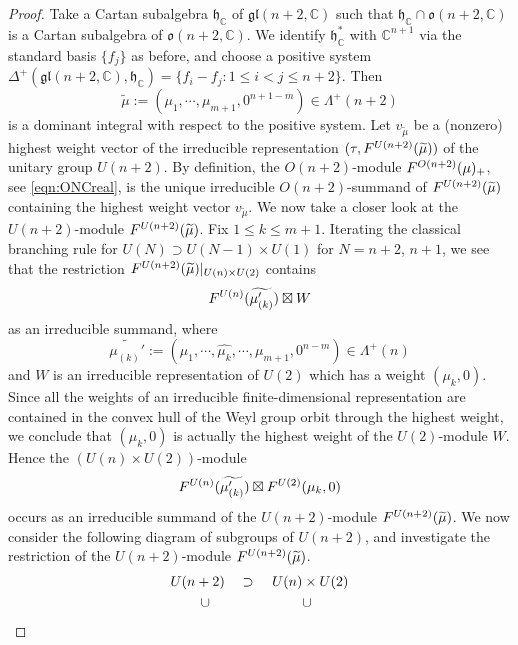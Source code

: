 \begin{proof}
Take a Cartan subalgebra ${\mathfrak{h}}_{\mathbb{C}}$
 of ${\mathfrak{g l}}(n+2,{\mathbb{C}})$
 such that ${\mathfrak{h}}_{\mathbb{C}} \cap {\mathfrak{o}}(n+2,{\mathbb{C}})$
 is a Cartan subalgebra of ${\mathfrak{o}}(n+2,{\mathbb{C}})$.  
We identify ${\mathfrak{h}}_{\mathbb{C}}^{\ast}$
 with ${\mathbb{C}}^{n+1}$ 
 via the standard basis $\{f_j\}$
 as before,
 and choose a positive system $\Delta^+({\mathfrak{gl }}(n+2,{\mathbb{C}}), {\mathfrak{h}}_{\mathbb{C}})=\{f_i-f_j: 1 \le i < j \le n+2\}$.  
Then 
\[
\widetilde \mu:=(\mu_1, \cdots,\mu_{m+1}, 0^{n+1-m})\in \Lambda^+(n+2)
\]
 is a dominant integral 
 with respect to the positive system. 
Let $v_{\widetilde \mu}$ be a (nonzero) highest weight vector
 of the irreducible representation 
 $(\tau, F^{{U(n+2)}}({\widetilde \mu}))$
 of the unitary group $U(n+2)$.  
By definition,
 the $O(n+2)$-module
 $F^{{O(n+2)}}({\mu})_+$, 
 see \eqref{eqn:ONCreal}, 
 is the unique irreducible $O(n+2)$-summand
 of $F^{{U(n+2)}}({\widetilde \mu})$
 containing the highest weight vector $v_{\widetilde \mu}$.  
We now take a closer look at the $U(n+2)$-module
 $F^{{U(n+2)}}({\widetilde \mu})$.  
Fix $1 \le k \le m+1$.  
Iterating the classical branching rule 
 for $U(N) \supset U(N-1) \times U(1)$
 for $N=n+2$, $n+1$,  
 we see that the restriction
 $F^{{U(n+2)}}({\widetilde \mu})|_{U(n) \times U(2)}$
 contains
\[
   F^{{U(n)}}({\widetilde {\mu_{(k)}'}}) \boxtimes W
\]
 as an irreducible summand,
 where
\[
  \widetilde{\mu_{(k)}'}:=(\mu_1, \cdots,\widehat{\mu_k}, \cdots,\mu_{m+1}, 0^{n-m}) \in \Lambda^+(n)
\]
and $W$ is an irreducible representation of $U(2)$
 which has a weight $(\mu_k,0)$.  
Since all the weights of an irreducible finite-dimensional representation
 are contained in the convex hull
 of the Weyl group orbit
 through the highest weight, 
 we conclude 
 that $(\mu_k,0)$ is actually the highest weight of the $U(2)$-module $W$.  
Hence the $(U(n) \times U(2))$-module
\[
   F^{{U(n)}}({\widetilde {\mu_{(k)}'}})
   \boxtimes
   F^{{U(2)}}({\mu_k,0})
\]
occurs as an irreducible summand
 of the $U(n+2)$-module 
 $F^{{U(n+2)}}({\widetilde \mu})$.  
We now consider the following diagram
 of subgroups of $U(n+2)$, 
 and investigate the restriction of the $U(n+2)$-module
 $F^{{U(n+2)}}({\widetilde \mu})$.  
\begin{alignat*}{3}
 &U(n+2) &&\supset\,\, &&U(n) \times U(2)
\\
 &\hphantom{MM} \cup && &&\hphantom{MM}\cup
\\

\end{alignat*}
\end{proof}
